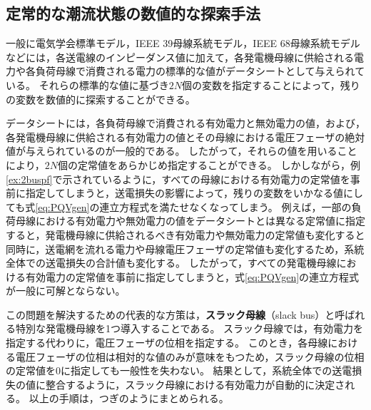 \documentclass[tombow,dvipdfmx]{corona-a5-1.1}
\begin{document}




\subsection{定常的な潮流状態の数値的な探索手法}


一般に電気学会標準モデル\cite{ieejstandardmodel}，IEEE 39母線系統モデル\cite{athay1979practical}，IEEE 68母線系統モデル\cite{singh2013ieee}などには，各送電線のインピーダンス値に加えて，各発電機母線に供給される電力や各負荷母線で消費される電力の標準的な値がデータシートとして与えられている。
それらの標準的な値に基づき$2N$個の変数を指定することによって，残りの変数を数値的に探索することができる。


データシートには，各負荷母線で消費される有効電力と無効電力の値，および，各発電機母線に供給される有効電力の値とその母線における電圧フェーザの絶対値が与えられているのが一般的である。
したがって，それらの値を用いることにより，$2N$個の定常値をあらかじめ指定することができる。
しかしながら，例\ref{ex:2buspf}で示されているように，すべての母線における有効電力の定常値を事前に指定してしまうと，送電損失の影響によって，残りの変数をいかなる値にしても式\ref{eq:PQVgen}の連立方程式を満たせなくなってしまう。
例えば，一部の負荷母線における有効電力や無効電力の値をデータシートとは異なる定常値に指定すると，発電機母線に供給されるべき有効電力や無効電力の定常値も変化すると同時に，送電網を流れる電力や母線電圧フェーザの定常値も変化するため，系統全体での送電損失の合計値も変化する。
したがって，すべての発電機母線における有効電力の定常値を事前に指定してしまうと，式\ref{eq:PQVgen}の連立方程式が一般に可解とならない。


この問題を解決するための代表的な方策は，\textbf{スラック母線}（slack bus）と呼ばれる特別な発電機母線を1つ導入することである。
スラック母線では，有効電力を指定する代わりに，電圧フェーザの位相を指定する。
このとき，各母線における電圧フェーザの位相は相対的な値のみが意味をもつため，スラック母線の位相の定常値を0に指定しても一般性を失わない。
結果として，系統全体での送電損失の値に整合するように，スラック母線における有効電力が自動的に決定される。
以上の手順は，つぎのようにまとめられる。
\end{document}
